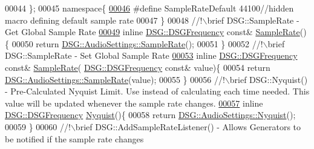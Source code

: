 \begin{DoxyCode}
00044     \};
00045     \textcolor{keyword}{namespace}\{
\hypertarget{_audio_settings_8h_source_l00046}{}\hyperlink{_audio_settings_8h_ad9d89453f9b7b69bd9beb58946863dd4}{00046} \textcolor{preprocessor}{#define SampleRateDefault 44100//hidden macro defining default sample rate}
00047     \}\textcolor{comment}{}
00048 \textcolor{comment}{    //!\(\backslash\)brief DSG::SampleRate - Get Global Sample Rate}
\hypertarget{_audio_settings_8h_source_l00049}{}\hyperlink{namespace_d_s_g_a72df05177db0412c3590070923f62819}{00049} \textcolor{comment}{}    \textcolor{keyword}{inline} \hyperlink{namespace_d_s_g_a4315a061386fa1014fda09b15d3a6973}{DSG::DSGFrequency} \textcolor{keyword}{const}& \hyperlink{namespace_d_s_g_a72df05177db0412c3590070923f62819}{SampleRate}()\{
00050         \textcolor{keywordflow}{return} \hyperlink{class_d_s_g_1_1_audio_settings_a4f459c389b10c11828e2f2f00c012c49}{DSG::AudioSettings::SampleRate}();
00051     \}\textcolor{comment}{}
00052 \textcolor{comment}{    //!\(\backslash\)brief DSG::SampleRate - Set Global Sample Rate}
\hypertarget{_audio_settings_8h_source_l00053}{}\hyperlink{namespace_d_s_g_a66a464f016da1a099abea61a27a84d18}{00053} \textcolor{comment}{}    \textcolor{keyword}{inline} \hyperlink{namespace_d_s_g_a4315a061386fa1014fda09b15d3a6973}{DSG::DSGFrequency} \textcolor{keyword}{const}& \hyperlink{namespace_d_s_g_a72df05177db0412c3590070923f62819}{SampleRate}(
      \hyperlink{namespace_d_s_g_a4315a061386fa1014fda09b15d3a6973}{DSG::DSGFrequency} \textcolor{keyword}{const}& value)\{
00054         \textcolor{keywordflow}{return} \hyperlink{class_d_s_g_1_1_audio_settings_a4f459c389b10c11828e2f2f00c012c49}{DSG::AudioSettings::SampleRate}(value);
00055     \}\textcolor{comment}{}
00056 \textcolor{comment}{    //!\(\backslash\)brief DSG::Nyquist() - Pre-Calculated Nyquist Limit. Use instead of calculating each time needed.
       This value will be updated whenever the sample rate changes.}
\hypertarget{_audio_settings_8h_source_l00057}{}\hyperlink{namespace_d_s_g_acb23c320b74d21f203081a25e1b5d134}{00057} \textcolor{comment}{}    \textcolor{keyword}{inline} \hyperlink{namespace_d_s_g_a4315a061386fa1014fda09b15d3a6973}{DSG::DSGFrequency} \hyperlink{namespace_d_s_g_acb23c320b74d21f203081a25e1b5d134}{Nyquist}()\{
00058         \textcolor{keywordflow}{return} \hyperlink{class_d_s_g_1_1_audio_settings_a8cb4afd7b58e927300ff46fbeb71bec7}{DSG::AudioSettings::Nyquist}();
00059     \}\textcolor{comment}{}
00060 \textcolor{comment}{    //!\(\backslash\)brief DSG::AddSampleRateListener() - Allows Generators to be notified if the sample rate changes}

\end{DoxyCode}
